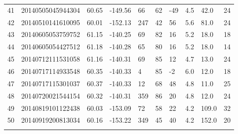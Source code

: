 \documentclass[11pt,titlepage,fleqn]{article}
\begin{document}
\begin{table}[]
\begin{tabular}{llllllllll}
41 & 20140505045944304 & 60.65 & -149.56 &  66 &  62 & -49 & 4.5 & 42.0 & 24 \\ 
42 & 20140510141610095 & 60.01 & -152.13 & 247 &  42 &  56 & 5.6 & 81.0 & 24 \\ 
43 & 20140605053759752 & 61.15 & -140.25 &  69 &  82 &  16 & 5.2 & 18.0 & 18 \\ 
44 & 20140605054427512 & 61.18 & -140.28 &  65 &  80 &  16 & 5.2 & 18.0 & 14 \\ 
45 & 20140712111531058 & 61.16 & -140.31 &  69 &  85 &  12 & 4.7 & 13.0 & 24 \\ 
46 & 20140717114933548 & 60.35 & -140.33 &   4 &  85 &  -2 & 6.0 & 12.0 & 18 \\ 
47 & 20140717115301037 & 60.37 & -140.33 &  12 &  68 &  48 & 4.8 & 11.0 & 25 \\ 
48 & 20140720021544154 & 60.32 & -140.31 & 359 &  86 &  20 & 4.8 & 12.0 & 24 \\ 
49 & 20140819101122438 & 60.03 & -153.09 &  72 &  58 &  22 & 4.2 & 109.0 & 32 \\ 
50 & 20140919200813034 & 60.16 & -153.22 & 349 &  45 &  40 & 4.2 & 152.0 & 20 \\ 
&  &  &  &  &  &  &  &  &  \\ \hline
\end{tabular}
\end{table}



\clearpage\pagebreak
\end{document}
